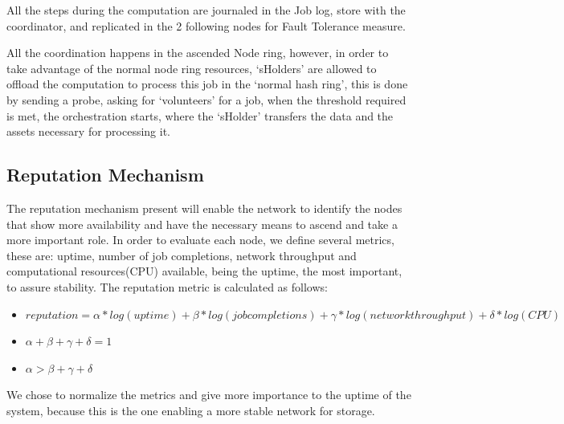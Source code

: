 All the steps during the computation are journaled in the Job log, store with the coordinator, and replicated in the 2 following nodes for Fault Tolerance measure.

All the coordination happens in the ascended Node ring, however, in order to take advantage of the normal node ring resources, `sHolders' are allowed to offload the computation to process this job in the `normal hash ring', this is done by sending a probe, asking for `volunteers' for a job, when the threshold required is met, the orchestration starts, where the `sHolder' transfers the data and the assets necessary for processing it.








\subsection{Reputation Mechanism}

The reputation mechanism present will enable the network to identify the nodes that show more availability and have the necessary means to ascend and take a more important role. In order to evaluate each node, we define several metrics, these are: uptime, number of job completions, network throughput and computational resources(CPU) available, being the uptime, the most important, to assure stability. The reputation metric is calculated as follows:

\begin{itemize}
  \item $reputation = \alpha * log(uptime) + \beta * log(job completions) + \gamma * log(network throughput) + \delta * log (CPU)$ 
  \item $\alpha+ \beta+ \gamma+ \delta = 1$
  \item $\alpha > \beta + \gamma + \delta$
\end{itemize}

We chose to normalize the metrics and give more importance to the uptime of the system, because this is the one enabling a more stable network for storage.

